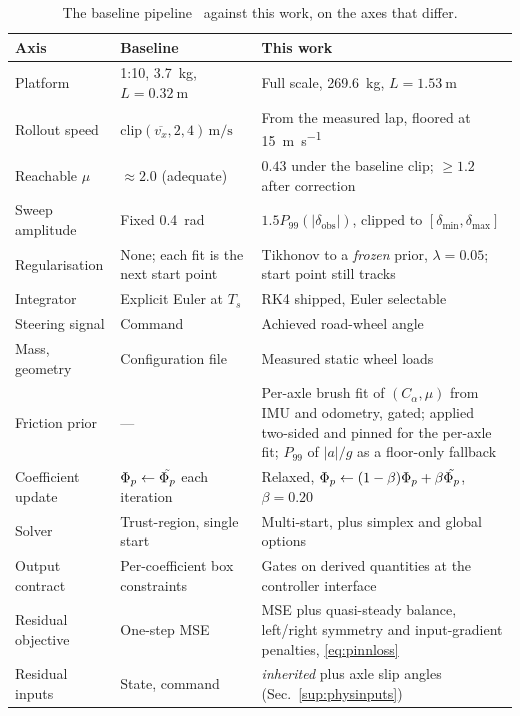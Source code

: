 \begin{table}[t]
\caption{The baseline pipeline~\cite{ontrack2025} against this work, on the
axes that differ.}
\label{sup:tabbaseline}
\centering
\begin{threeparttable}
\scriptsize
\setlength{\tabcolsep}{3pt}
\begin{tabular}{@{}p{1.95cm}p{2.55cm}p{3.0cm}@{}}
\toprule
Axis & Baseline~\cite{ontrack2025} & This work\\
\midrule
Platform & 1:10, \SI{3.7}{\kilo\gram}, $L=\SI{0.32}{\meter}$ &
Full scale, \SI{269.6}{\kilo\gram}, $L=\SI{1.53}{\meter}$\\
Rollout speed & $\mathrm{clip}(\overline{v_{x}},2,4)\,\si{\meter\per\second}$ &
From the measured lap, floored at \SI{15}{\meter\per\second}\\
Reachable $\mu$ & $\approx2.0$ (adequate) & $0.43$ under the baseline clip;
$\ge1.2$ after correction\\
Sweep amplitude & Fixed \SI{0.4}{\radian} &
$1.5P_{99}(|\delta_{\mathrm{obs}}|)$, clipped to
$[\delta_{\min},\delta_{\max}]$\\
Regularisation & None; each fit is the next start point &
Tikhonov to a \emph{frozen} prior, $\lambda=\num{0.05}$; start point still
tracks\\
Integrator & Explicit Euler at $T_{s}$ & RK4 shipped, Euler selectable\\
Steering signal & Command & Achieved road-wheel angle\\
Mass, geometry & Configuration file & Measured static wheel loads\\
Friction prior & --- & Per-axle brush fit of $(C_{\alpha},\mu)$ from IMU and
odometry, gated; applied two-sided and pinned for the per-axle fit; $P_{99}$ of
$|a|/g$ as a floor-only fallback\\
Coefficient update & $\Phi_{p}\leftarrow\tilde{\Phi_{p}}$ each iteration & Relaxed,
$\Phi_{p}\leftarrow(1-\beta)\Phi_{p}+\beta\tilde{\Phi_{p}}$, $\beta=\num{0.20}$\\
Solver & Trust-region, single start & Multi-start, plus simplex and global
options\\
Output contract & Per-coefficient box constraints & Gates on derived
quantities at the controller interface\\
Residual objective & One-step MSE & MSE plus quasi-steady balance, left/right
symmetry and input-gradient penalties, \eqref{eq:pinnloss}\\
Residual inputs & State, command & \emph{inherited} plus axle slip angles
(Sec.~\ref{sup:physinputs})\\

\end{tabular}
\end{threeparttable}
\end{table}

